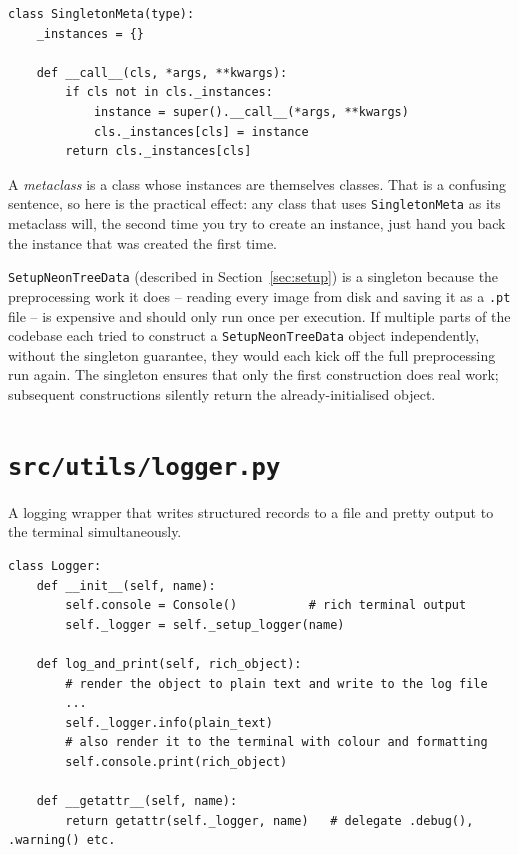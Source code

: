 \documentclass[11pt, a4paper]{article}
\newenvironment{intuition}{%
  \begin{tcolorbox}[
    colback=warnbg, colframe=warnframe,
    fonttitle=\bfseries, title=Why does the code do this?,
    breakable, enhanced
  ]
}{%
  \end{tcolorbox}
}
\newenvironment{filebox}[1]{%
  \begin{tcolorbox}[
    colback=filebg, colframe=fileframe,
    fonttitle=\bfseries\ttfamily, title=#1,
    breakable, enhanced
  ]
}{%
  \end{tcolorbox}
}
\begin{document}
\begin{lstlisting}
class SingletonMeta(type):
    _instances = {}

    def __call__(cls, *args, **kwargs):
        if cls not in cls._instances:
            instance = super().__call__(*args, **kwargs)
            cls._instances[cls] = instance
        return cls._instances[cls]
\end{lstlisting}

A \emph{metaclass} is a class whose instances are themselves classes. That is
a confusing sentence, so here is the practical effect: any class that uses
\texttt{SingletonMeta} as its metaclass will, the second time you try to
create an instance, just hand you back the instance that was created the first
time.

\begin{intuition}
  \texttt{SetupNeonTreeData} (described in Section~\ref{sec:setup}) is a
  singleton because the preprocessing work it does -- reading every image from
  disk and saving it as a \texttt{.pt} file -- is expensive and should only
  run once per execution. If multiple parts of the codebase each tried to
  construct a \texttt{SetupNeonTreeData} object independently, without the
  singleton guarantee, they would each kick off the full preprocessing run
  again. The singleton ensures that only the first construction does real work;
  subsequent constructions silently return the already-initialised object.
\end{intuition}

\section{\texttt{src/utils/logger.py}}

\begin{filebox}{src/utils/logger.py}
  A logging wrapper that writes structured records to a file and pretty output
  to the terminal simultaneously.
\end{filebox}

\begin{lstlisting}
class Logger:
    def __init__(self, name):
        self.console = Console()          # rich terminal output
        self._logger = self._setup_logger(name)

    def log_and_print(self, rich_object):
        # render the object to plain text and write to the log file
        ...
        self._logger.info(plain_text)
        # also render it to the terminal with colour and formatting
        self.console.print(rich_object)

    def __getattr__(self, name):
        return getattr(self._logger, name)   # delegate .debug(), .warning() etc.
\end{lstlisting}
\end{document}
